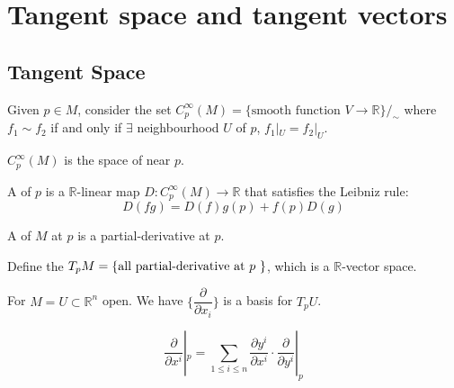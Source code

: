
\section{Tangent space and tangent vectors}
\subsection{Tangent Space}
Given  $ p\in M  $, consider the set  $ C_p^\infty(M)=\{\text{smooth function } V\rightarrow \mathbb{R}\}/_\sim $ where  $ f_1\sim f_2 $ if and only if  $ \exists $ neighbourhood  $ U $ of  $ p $,  $ f_1|_U=f_2|_U $.

 $ C_p^\infty(M) $ is the space of  near  $ p $. 

 
A  of  $ p $ is a  $ \mathbb{R} $-linear map  $ D:C_p^\infty(M)\rightarrow \mathbb{R} $ that satisfies the Leibniz rule:
\[D(fg)=D(f)g(p)+f(p)D(g)\] 
\begin{definition}
    A  of  $ M  $ at  $ p  $ is a partial-derivative at  $ p $.
    
    Define the   $ T_pM=\{\text{all partial-derivative at  $ p $ }\} $, which is a  $ \mathbb{R} $-vector space.   
\end{definition}
\begin{proposition}
    For  $ M=U\subset \mathbb{R}^n $ open. We have  $ \{\dfrac{\partial }{\partial x_i}\} $ is a basis for  $ T_pU $.   
\end{proposition}
\begin{proposition}
    \[\frac{\partial }{\partial x^i}|_p=\sum\limits_{1 \leq i \leq n}\frac{\partial y^i}{\partial x^i}\cdot \frac{\partial }{\partial y^i}|_p\]
\end{proposition}
